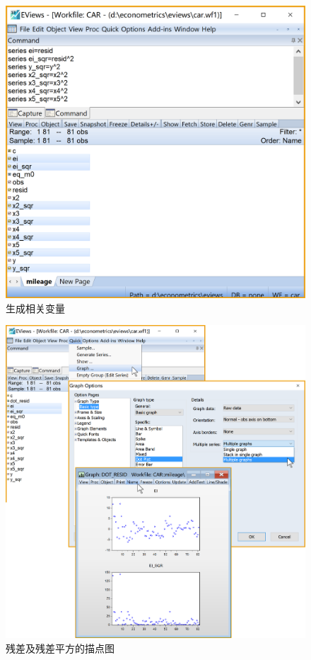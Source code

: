 \documentclass[12pt,(landscape,a4paper),(portrait,a4paper)]{article}
\begin{document}
\begin{figure}

{\centering \includegraphics[width=21.26in]{picture/lab6-heteroskedasticity/3-generate-series} 

}

\caption{生成相关变量}\label{fig:fig-gen-series}
\end{figure}

\begin{figure}

{\centering \includegraphics[width=31.93in]{picture/lab6-heteroskedasticity/3-dot-resid} 

}

\caption{残差及残差平方的描点图}\label{fig:fig-dot-resid}
\end{figure}
\end{document}
